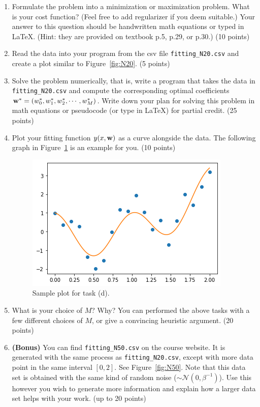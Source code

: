 \documentclass[12pt,a4paper]{article}
\renewcommand{\v}[1]{\ifmmode\mathbf{#1}\fi}
\begin{document}
\begin{enumerate}[label=(\alph*)]
\item Formulate the problem into a minimization or maximization problem. What is your cost function? (Feel free to add regularizer if you deem suitable.) Your answer to this question should be handwritten math equations or typed in \LaTeX. (Hint: they are provided on textbook p.5, p.29, or p.30.) (10 points)
\item Read the data into your program from the csv file \texttt{fitting\_N20.csv} and create a plot similar to Figure~\ref{fig:N20}. (5 points)
\item Solve the problem numerically, that is, write a program that takes the data in \texttt{fitting\_N20.csv} and compute the corresponding optimal coefficients $\v w^\ast = (w_0^\ast, w_1^\ast, w_2^\ast, \cdots, w_M^\ast)$. Write down your plan for solving this problem in math equations or pseudocode (or type in \LaTeX) for partial credit. (25 points) 
\item Plot your fitting function $y(x, \v w)$ as a curve alongside the data. The following graph in Figure~\ref{fig:curve} is an example for you. (10 points) 
\begin{figure}[h]
\centering
\includegraphics[scale=0.6]{TP1_fitting_N20_curve} 
\caption{Sample plot for task (d).}
\label{fig:curve}
\end{figure}
\item What is your choice of $M$? Why? You can performed the above tasks with a few different choices of $M$, or give a convincing heuristic argument. (20 points)
\item \textbf{(Bonus)} You can find \texttt{fitting\_N50.csv} on the course website. It is generated with the same process as \texttt{fitting\_N20.csv}, except with more data point in the same interval $[0, 2]$. See Figure~\ref{fig:N50}. Note that this data set is obtained with the same kind of random noise ($\sim \mathcal N(0, \beta^{-1})$). Use this however you wish to generate more information and explain how a larger data set helps with your work. (up to 20 points)

\end{enumerate}
\end{document}
